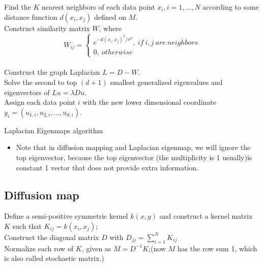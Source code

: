 \begin{refsection}
\begin{algorithm}[H]
	\SetAlgoLined
	Find the $K$ nearest neighbors of each data point $x_i,i=1,...,N$ according to some distance function $d(x_i,x_j)$ defined on $M$.\\
	Construct similarity matrix $W$, where
	$$W_{ij} = \begin{cases}
	e^{-d(x_i,x_j)^2/\sigma^2}, ~if~ i,j ~ are ~ neighbors\\
	0,~otherwise
	\end{cases}$$\\
	Construct the graph Laplacian $L = D - W$.\\
	Solve the second to top $(d+1)$ smallest generalized eigenvalues and eigenvectors of $Lu = \lambda Du$.\\
		Assign each data point $i$ with the new lower dimensional coordinate $y_i = (u_{1,i},u_{2,i},...,u_{d,i})$.\\
	
	\caption{Laplacian Eigenmaps algorithm}
\end{algorithm}


\begin{remark}\hfill
	\begin{itemize}
		\item Note that in diffusion mapping and Laplacian eigenmap, we will ignore the top eigenvector, because the top eigenvector (the multiplicity is  1 usually)is constant 1 vector that does not provide extra information.
	\end{itemize}
\end{remark}



\subsection{Diffusion map}
\begin{algorithm}[H]
\SetAlgoLined
{}
 Define a semi-positive symmetric kernel $k(x,y)$ and construct a kernel matrix $K$ such that $K_{ij} = k(x_i,x_j)$;\\
 
 Construct the diagonal matrix $D$ with $D_{jj}=\sum_{i=1}^N K_{ij}$\\
 
 Normalize each row of $K$, given as $M = D^{-1}K$;(now $M$ has the row sum 1, which is also called stochastic matrix.)
 

\end{algorithm}
\end{refsection}
